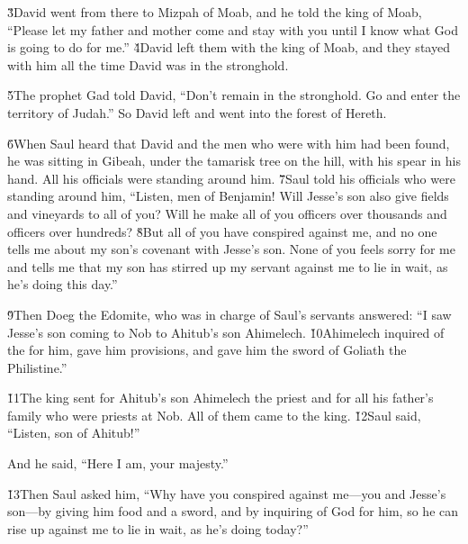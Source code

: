 \v{3}David went from there to Mizpah of Moab, and he told the king of Moab, ``Please let my father and mother come and stay with you until I know what God is going to do for me.'' \v{4}David left them with the king of Moab, and they stayed with him all the time David was in the stronghold.

\v{5}The prophet Gad told David, ``Don't remain in the stronghold. Go and enter the territory of Judah.'' So David left and went into the forest of Hereth.

\v{6}When Saul heard that David and the men who were with him had been found, he was sitting in Gibeah, under the tamarisk tree on the hill, with his spear in his hand. All his officials were standing around him. \v{7}Saul told his officials who were standing around him, ``Listen, men of Benjamin! Will Jesse's son also give fields and vineyards to all of you? Will he make all of you officers over thousands and officers over hundreds? \v{8}But all of you have conspired against me, and no one tells me about my son's covenant with Jesse's son. None of you feels sorry for me and tells me that my son has stirred up my servant against me to lie in wait, as he's doing this day.''

\v{9}Then Doeg the Edomite, who was in charge of Saul's servants answered: ``I saw Jesse's son coming to Nob to Ahitub's son Ahimelech. \v{10}Ahimelech inquired of the  for him, gave him provisions, and gave him the sword of Goliath the Philistine.''

\v{11}The king sent for Ahitub's son Ahimelech the priest and for all his father's family who were priests at Nob. All of them came to the king. \v{12}Saul said, ``Listen, son of Ahitub!''

And he said, ``Here I am, your majesty.''

\v{13}Then Saul asked him, ``Why have you conspired against me---you and Jesse's son---by giving him food and a sword, and by inquiring of God for him, so he can rise up against me to lie in wait, as he's doing today?''

